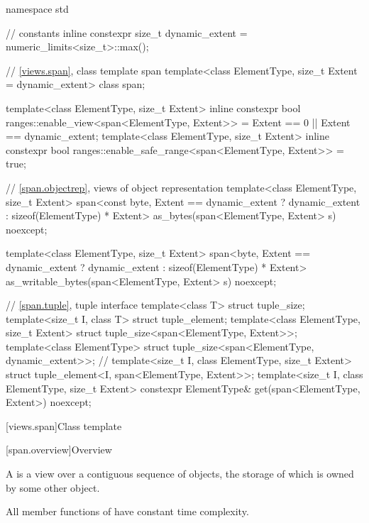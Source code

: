 %
\begin{codeblock}
namespace std {
  // constants
  inline constexpr size_t dynamic_extent = numeric_limits<size_t>::max();

  // \ref{views.span}, class template span
  template<class ElementType, size_t Extent = dynamic_extent>
    class span;

  template<class ElementType, size_t Extent>
    inline constexpr bool ranges::enable_view<span<ElementType, Extent>> =
      Extent == 0 || Extent == dynamic_extent;
  template<class ElementType, size_t Extent>
    inline constexpr bool ranges::enable_safe_range<span<ElementType, Extent>> = true;

  // \ref{span.objectrep}, views of object representation
  template<class ElementType, size_t Extent>
    span<const byte, Extent == dynamic_extent ? dynamic_extent : sizeof(ElementType) * Extent>
      as_bytes(span<ElementType, Extent> s) noexcept;

  template<class ElementType, size_t Extent>
    span<byte, Extent == dynamic_extent ? dynamic_extent : sizeof(ElementType) * Extent>
      as_writable_bytes(span<ElementType, Extent> s) noexcept;

  // \ref{span.tuple}, tuple interface
  template<class T> struct tuple_size;
  template<size_t I, class T> struct tuple_element;
  template<class ElementType, size_t Extent>
    struct tuple_size<span<ElementType, Extent>>;
  template<class ElementType>
    struct tuple_size<span<ElementType, dynamic_extent>>;       // \notdef
  template<size_t I, class ElementType, size_t Extent>
    struct tuple_element<I, span<ElementType, Extent>>;
  template<size_t I, class ElementType, size_t Extent>
    constexpr ElementType& get(span<ElementType, Extent>) noexcept;
}
\end{codeblock}

[views.span]{Class template }

[span.overview]{Overview}

\pnum
{}%
A  is a view over a contiguous sequence of objects,
the storage of which is owned by some other object.

\pnum
All member functions of  have constant time complexity.

